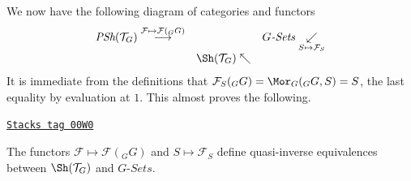 \medskip\noindent
We now have the following diagram of categories and functors
$$
\begin{array}{ccc}\textit{PSh}(\mathcal{T}_G) \overset{\mathcal{F} \mapsto \mathcal{F}({}_GG)}{\longrightarrow} &  & G\textit{-Sets} \underset{S \mapsto \mathcal{F}_S}{\swarrow} \\  & \Sh(\mathcal{T}_G) \nwarrow & \end{array}
$$
It is immediate from the definitions that $\mathcal{F}_S({}_GG)
= \Mor_G({}_GG, S) = S$, the last equality by evaluation at $1$.
This almost proves the following.

\begin{proposition}
\label{sites-proposition-sheaves-on-group}
\href{https://stacks.math.columbia.edu/tag/00W0}{\texttt{Stacks tag 00W0}}

The functors $\mathcal{F} \mapsto \mathcal{F}({}_GG)$
and $S \mapsto \mathcal{F}_S$ define quasi-inverse
equivalences between $\Sh(\mathcal{T}_G)$
and $G\textit{-Sets}$.
\end{proposition}


